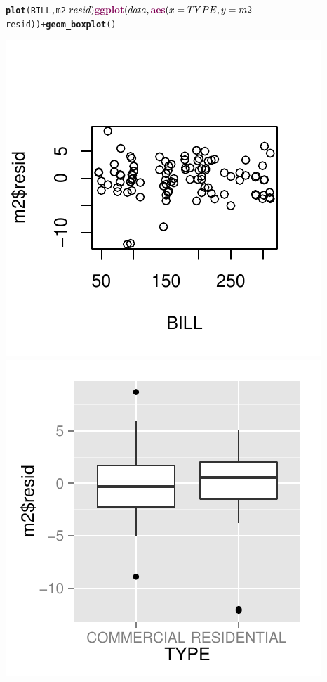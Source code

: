 \documentclass{article}\usepackage{graphicx, color}
\makeatletter
\def\maxwidth{ %
  \ifdim\Gin@nat@width>\linewidth
    \linewidth
  \else
    \Gin@nat@width
  \fi
}
\newcommand{\hlfunctioncall}[1]{\textcolor[rgb]{0.501960784313725,0,0.329411764705882}{\textbf{#1}}}%
\newenvironment{kframe}{%
 \def\at@end@of@kframe{}%
 \ifinner\ifhmode%
  \def\at@end@of@kframe{\end{minipage}}%
  \begin{minipage}{\columnwidth}%
 \fi\fi%
 \def\FrameCommand##1{\hskip\@totalleftmargin \hskip-\fboxsep
 \colorbox{shadecolor}{##1}\hskip-\fboxsep
     \hskip-\linewidth \hskip-\@totalleftmargin \hskip\columnwidth}%
 \MakeFramed {\advance\hsize-\width
   \@totalleftmargin\z@ \linewidth\hsize
   \@setminipage}}%
 {\par\unskip\endMakeFramed%
 \at@end@of@kframe}
\newenvironment{knitrout}{}{} %
\makeatother
\begin{document}
\begin{knitrout}
\color{fgcolor}\begin{kframe}
\begin{alltt}

\hlfunctioncall{plot}(BILL, m2$resid)
\hlfunctioncall{ggplot}(data, \hlfunctioncall{aes}(x = TYPE, y = m2$resid)) + \hlfunctioncall{geom_boxplot}()
\end{alltt}
\end{kframe}
\includegraphics[width=\maxwidth]{figure/unnamed-chunk-31} 
\includegraphics[width=\maxwidth]{figure/unnamed-chunk-32} 

\end{knitrout}
\end{document}
